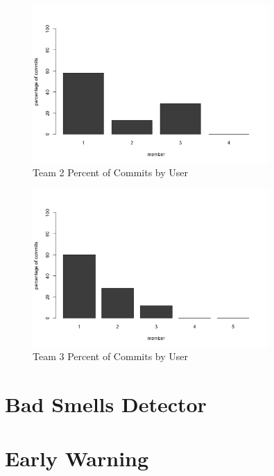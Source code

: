 \documentclass[conference]{IEEEtran}
\begin{document}
\begin{figure}[H]
    \centering
    \includegraphics[width=9cm]{../AprilProject/pic/users commit percentage team2.png}
    \caption{Team 2 Percent of Commits by User}
    \label{team2_percent_commit}
\end{figure}

\begin{figure}[H]
    \centering
    \includegraphics[width=9cm]{../AprilProject/pic/users commit percentage team3.png}
    \caption{Team 3 Percent of Commits by User}
    \label{team3_percent_commit}
\end{figure}

\section{Bad Smells Detector}
\section{Early Warning}
\end{document}
